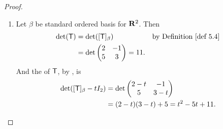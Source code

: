 \begin{proof} \ 

\begin{enumerate}
\item Let \(\beta\) be standard ordered basis for \(\mathbf{R}^2\).
Then
\begin{align*}
    \det(\T) & = \det([\T]_{\beta}) & \text{by \DEF{5.4}} \\
             & = \det \begin{pmatrix} 2 & -1 \\ 5 & 3  \end{pmatrix} = 11.
\end{align*}
And the \CPOLY{} of \(\textsf{T}\), by , is
\begin{align*}
    \det([\textsf{T}]_{\beta} - tI_2) & = \det \begin{pmatrix}
        2-t & -1 \\ 5 & 3-t
    \end{pmatrix} \\
        & = (2 - t)(3 - t) + 5 = t^2 - 5t + 11.
\end{align*}


\end{enumerate}
\end{proof}
